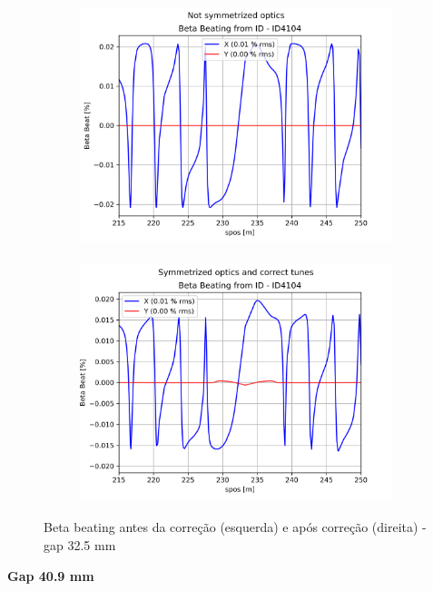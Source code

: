 \documentclass[a4paper,12pt]{article}
\begin{document}
\begin{figure}[H]
\begin{subfigure}{0.5\textwidth}
\includegraphics[width=0.9\linewidth, height=7cm]{figs/phase0 gap32 uncorrected-optics.png} 
\label{fig:subim1032}
\end{subfigure}
\begin{subfigure}{0.5\textwidth}
\includegraphics[width=0.9\linewidth, height=7cm]{figs/phase0 gap32 corrected-optics-tunes.png}
\label{fig:subim2032}
\end{subfigure}
\caption{Beta beating antes da correção (esquerda) e após correção (direita) - gap 32.5 mm}
\label{fig:bb0_32}
\end{figure}

\textbf{Gap 40.9 mm} \\
\end{document}

